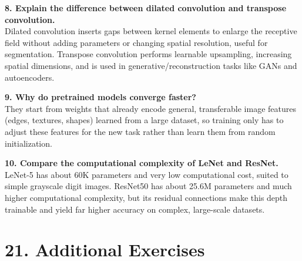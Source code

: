 \documentclass[11pt]{article}
\begin{document}
\textbf{8. Explain the difference between dilated convolution and transpose convolution.}\\
Dilated convolution inserts gaps between kernel elements to enlarge the
receptive field without adding parameters or changing spatial resolution,
useful for segmentation. Transpose convolution performs learnable
upsampling, increasing spatial dimensions, and is used in
generative/reconstruction tasks like GANs and autoencoders.

\textbf{9. Why do pretrained models converge faster?}\\
They start from weights that already encode general, transferable image
features (edges, textures, shapes) learned from a large dataset, so
training only has to adjust these features for the new task rather than
learn them from random initialization.

\textbf{10. Compare the computational complexity of LeNet and ResNet.}\\
LeNet-5 has about 60K parameters and very low computational cost, suited
to simple grayscale digit images. ResNet50 has about 25.6M parameters and
much higher computational complexity, but its residual connections make
this depth trainable and yield far higher accuracy on complex,
large-scale datasets.


\section*{21. Additional Exercises}
\end{document}
